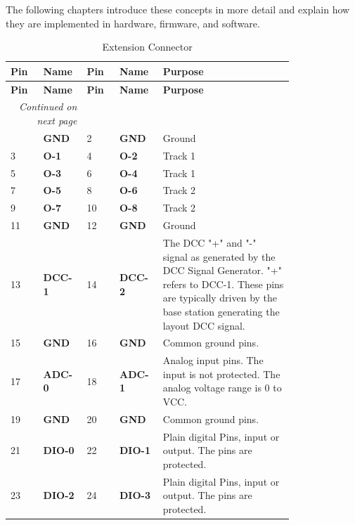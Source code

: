 The following chapters introduce these concepts in more detail and explain how they are implemented in hardware, firmware, and software.





\begin{longtable}{@{}|p{0.1\linewidth}|p{0.1\linewidth}|p{0.1\linewidth}|p{0.1\linewidth}|p{0.4\linewidth}|@{}}
    \caption{Extension Connector} \\
    \toprule
    \textbf{Pin} & \textbf{Name} & \textbf{Pin} & \textbf{Name} & \textbf{Purpose} \\
    \midrule
    \endfirsthead
    \toprule
    \textbf{Pin} & \textbf{Name} & \textbf{Pin} & \textbf{Name} & \textbf{Purpose} \\
    \midrule
    \endhead
    \midrule
    \multicolumn{2}{r}{\textit{Continued on next page}} \\
    \midrule
    \endfoot
    \bottomrule
    \endlastfoot
    1 & \textbf{GND} & 2 & \textbf{GND} & Ground \\
    \midrule
    3 & \textbf{O-1} & 4 & \textbf{O-2} & Track 1 \\
    \midrule
    5 & \textbf{O-3} & 6 & \textbf{O-4} & Track 1 \\
    \midrule
    7 & \textbf{O-5} & 8 & \textbf{O-6} & Track 2 \\
    \midrule
    9 & \textbf{O-7} & 10 & \textbf{O-8} & Track 2 \\
    \midrule
    11 & \textbf{GND} & 12 & \textbf{GND} & Ground \\
    \midrule
    13 & \textbf{DCC-1} & 14 & \textbf{DCC-2} & The DCC "+" and "-" signal as generated by the DCC Signal Generator. "+" refers to DCC-1. These pins are typically driven by the base station generating the layout DCC signal.\\
    \midrule
    15 & \textbf{GND} & 16 & \textbf{GND} & Common ground pins. \\
    \midrule
    17 & \textbf{ADC-0} & 18 & \textbf{ADC-1} & Analog input pins. The input is not protected. The analog voltage range is 0 to VCC. \\
    \midrule
    19 & \textbf{GND} & 20 & \textbf{GND} & Common ground pins. \\
    \midrule
    21 & \textbf{DIO-0} & 22 & \textbf{DIO-1} & Plain digital Pins, input or output. The pins are protected. \\
    \midrule
    23 & \textbf{DIO-2} & 24 & \textbf{DIO-3} & Plain digital Pins, input or output. The pins are protected. \\

\end{longtable}
